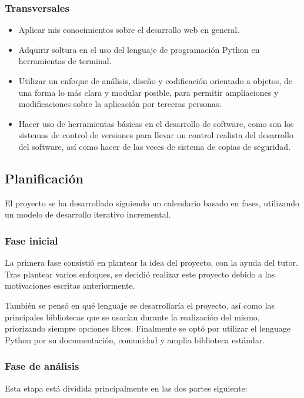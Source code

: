 \documentclass[a4paper,12pt]{article}
\begin{document}
\subsubsection{Transversales}
\begin{itemize}
\item Aplicar mis conocimientos sobre el desarrollo web en general.
\item Adquirir soltura en el uso del lenguaje de programación Python en herramientas de terminal.
\item Utilizar un enfoque de análisis, diseño y codificación orientado a objetos,
de una forma lo más clara y modular posible, para permitir ampliaciones y
modificaciones sobre la aplicación por terceras personas.
\item Hacer uso de herramientas básicas en el desarrollo de software, como son los
sistemas de control de versiones para llevar un control realista del desarrollo
del software, así como hacer de las veces de sistema de copias de seguridad.
\end{itemize}

\subsection{Planificación}

El proyecto se ha desarrollado siguiendo un calendario basado en fases, utilizando un modelo
de desarrollo iterativo incremental.

\subsubsection{Fase inicial}

La primera fase consistió en plantear la idea del proyecto, con la ayuda del tutor. Tras plantear
varios enfoques, se decidió realizar este proyecto debido a las motivaciones escritas anteriormente.

También se pensó en qué lenguaje se desarrollaría el proyecto, así como las principales bibliotecas que
se usarían durante la realización del mismo, priorizando siempre opciones libres. Finalmente se optó por
utilizar el lenguage Python por su documentación, comunidad y amplia biblioteca estándar.

\subsubsection{Fase de análisis}

Esta etapa está dividida principalmente en las dos partes siguiente:
\end{document}
